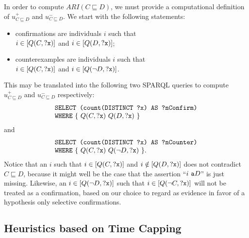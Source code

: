 \documentclass[conference]{IEEEtran}
\begin{document}
In order to compute $ARI(C \sqsubseteq D)$, we must provide a computational definition of $u^+_{C \sqsubseteq D}$ and $u^-_{C \sqsubseteq D}$. We start with the following statements:
\begin{itemize}
\item confirmations are individuals $i$ such that\\
  $i \in [Q(C, \mbox{\tt ?x})]$ and $i \in [Q(D, \mbox{\tt ?x})]$;
\item counterexamples are individuals $i$ such that\\
  $i \in [Q(C, \mbox{\tt ?x})]$ and $i \in [Q(\neg D, \mbox{\tt ?x})]$.
\end{itemize}
This may be translated into the following two SPARQL queries to compute $u^+_{C \sqsubseteq D}$ and $u^-_{C \sqsubseteq D}$ respectively:
\begin{equation}
  \begin{minipage}[c]{5in}
    \begin{tabbing}
      \quad\=\quad\=\quad\=\kill
      \texttt{SELECT (count(DISTINCT ?x) AS ?nConfirm)}\\
      \texttt{WHERE} \{ $Q(C, \mbox{\tt ?x})$ $Q(D, \mbox{\tt ?x})$ \}
    \end{tabbing}
  \end{minipage}
\end{equation}
and
\begin{equation}
  \begin{minipage}[c]{5in}
    \begin{tabbing}
      \quad\=\quad\=\quad\=\kill
      \texttt{SELECT (count(DISTINCT ?x) AS ?nCounter)}\\
      \texttt{WHERE} \{ $Q(C, \mbox{\tt ?x})$ $Q(\neg D, \mbox{\tt ?x})$ \}.
    \end{tabbing}
  \end{minipage}
\end{equation}
Notice that an $i$ such that $i \in [Q(C, \mbox{\tt ?x})]$ and $i \notin [Q(D, \mbox{\tt ?x})]$
does not contradict $C \sqsubseteq D$, because it might well be the case
that the assertion ``$i \mbox{\tt\ a } D$'' is just missing.
Likewise, an $i \in [Q(\neg D, \mbox{\tt ?x})]$ such that $i \in [Q(\neg C, \mbox{\tt ?x})]$
will not be treated as a confirmation, based on our choice to regard as
evidence in favor of a hypothesis only selective confirmations.



\subsection{Heuristics based on Time Capping}
\end{document}
